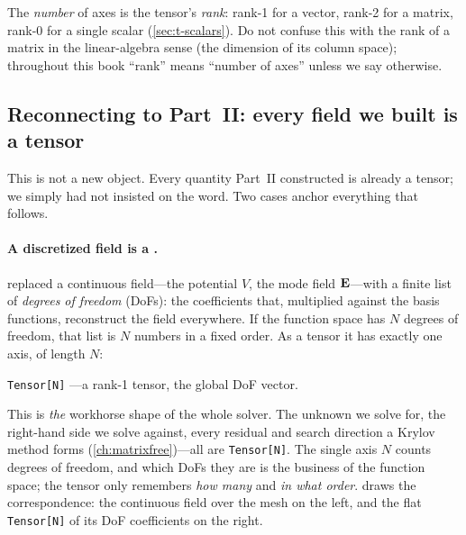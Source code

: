 The \emph{number} of axes is the tensor's \emph{rank}: rank-1 for a vector,
rank-2 for a matrix, rank-0 for a single scalar (\cref{sec:t-scalars}). Do not
confuse this with the rank of a matrix in the linear-algebra sense (the dimension
of its column space); throughout this book ``rank'' means ``number of axes''
unless we say otherwise.

\subsection{Reconnecting to Part~II: every field we built is a tensor}
\label{sec:t-reconnect}

This is not a new object. Every quantity Part~II constructed is already a tensor;
we simply had not insisted on the word. Two cases anchor everything that follows.

\paragraph{A discretized field is a .}
 replaced a continuous field---the potential $V$, the
mode field $\mathbf{E}$---with a finite list of \emph{degrees of freedom} (DoFs): the
coefficients that, multiplied against the basis functions, reconstruct the field
everywhere. If the function space has $N$ degrees of freedom, that list is $N$
numbers in a fixed order. As a tensor it has exactly one axis, of length $N$:

\begin{center}
\lstinline[style=l4style]|Tensor[N]| \quad---\quad a rank-1 tensor, the global
DoF vector.
\end{center}

\noindent This is \emph{the} workhorse shape of the whole solver. The unknown we
solve for, the right-hand side we solve against, every residual and search
direction a Krylov method forms (\cref{ch:matrixfree})---all are
\lstinline[style=l4style]|Tensor[N]|. The single axis $N$ counts degrees of
freedom, and which DoFs they are is the business of the function space; the
tensor only remembers \emph{how many} and \emph{in what order}.
 draws the correspondence: the continuous field over the
mesh on the left, and the flat \lstinline[style=l4style]|Tensor[N]| of its DoF
coefficients on the right.

